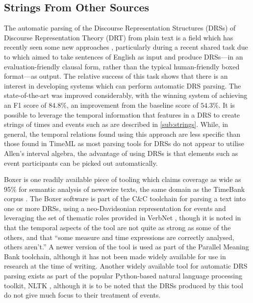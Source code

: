 \documentclass[a4paper,12pt,leqno]{article}
\begin{document}
\subsection{Strings From Other Sources}\label{sub:enhancing}
The automatic parsing of the Discourse Representation Structures (DRSs) of Discourse Representation Theory (DRT) \citep{kamp1981theory} from plain text is a field which has recently seen some new approaches \citep{abzianidze2017parallel,van-noord-etal-2018-exploring}, particularly during a recent shared task due to \citet{abzianidze2019first} which aimed to take sentences of English as input and produce DRSs---in an evaluation-friendly clausal form, rather than the typical human-friendly boxed format---as output. The relative success of this task shows that there is an interest in developing systems which can perform automatic DRS parsing. The state-of-the-art was improved considerably, with the winning system of \citet{liu2019discourse} achieving an F1 score of $84.8\%$, an improvement from the baseline score of $54.3\%$. It is possible to leverage the temporal information that features in a DRS to create strings of times and events such as are described in \cref{sub:strings}. While, in general, the temporal relations found using this approach are less specific than those found in TimeML as most parsing tools for DRSs do not appear to utilise Allen's interval algebra, the advantage of using DRSs is that elements such as event participants can be picked out automatically.

Boxer \citep{Bos2008} is one readily available piece of tooling which claims coverage as wide as 95\% for semantic analysis of newswire texts, the same domain as the TimeBank corpus \citep{pustejovsky2006timebank}. The Boxer software is part of the C\&C toolchain \citep{curran2007linguistically} for parsing a text into one or more DRSs, using a neo-Davidsonian representation for events and leveraging the set of thematic roles provided in VerbNet \citep{schuler2005verbnet}, though it is noted in \citet[p. 277]{Bos2008} that the temporal aspects of the tool are not quite as strong as some of the others, and that ``some measure and time expressions are correctly analysed, others aren't.'' A newer version of the tool is used as part of the Parallel Meaning Bank \citep{abzianidze2017parallel} toolchain, although it has not been made widely available for use in research at the time of writing. Another widely available tool for automatic DRS parsing exists as part of the popular Python-based natural language processing toolkit, NLTK \citep{Bird2009}, although it is to be noted that the DRSs produced by this tool do not give much focus to their treatment of events.
\end{document}
